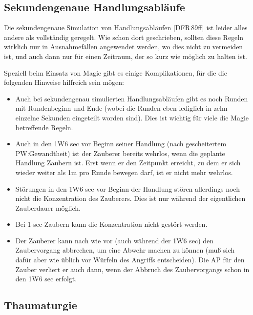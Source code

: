 \documentclass[10pt,a4paper,germanpar]{article}
\begin{document}


\subsection{Sekundengenaue Handlungsabläufe}

Die sekundengenaue Simulation von Handlungsabläufen [DFR\,89ff] ist
leider alles andere als vollständig geregelt. Wie schon dort
geschrieben, sollten diese Regeln wirklich nur in Ausnahmefällen
angewendet werden, wo dies nicht zu vermeiden ist, und auch dann nur
für einen Zeitraum, der so kurz wie möglich zu halten ist.

Speziell beim Einsatz von Magie gibt es einige Komplikationen, für die
die folgenden Hinweise hilfreich sein mögen:

\begin{itemize}
\item Auch bei sekundengenau simulierten Handlungsabläufen gibt es
  noch Runden mit Rundenbeginn und Ende (wobei die Runden eben
  lediglich in zehn einzelne Sekunden eingeteilt worden sind). Dies
  ist wichtig für viele die Magie betreffende Regeln.
\item Auch in den 1W6 sec vor Beginn seiner Handlung (nach gescheitertem
  PW:Gewandtheit) ist der Zauberer bereits wehrlos, wenn die geplante Handlung
  Zaubern ist. Erst wenn er den Zeitpunkt erreicht, zu dem er sich
  wieder weiter als 1m pro Runde bewegen darf, ist er nicht mehr wehrlos.
\item Störungen in den 1W6 sec vor Beginn der Handlung stören
  allerdings noch nicht die Konzentration des Zauberers. Dies ist nur
  während der eigentlichen Zauberdauer möglich.
\item Bei 1-sec-Zaubern kann die Konzentration nicht gestört werden.
\item Der Zauberer kann nach wie vor (auch während der 1W6 sec) den
  Zaubervorgang abbrechen, um eine Abwehr machen zu können (muß sich dafür
  aber wie üblich vor Würfeln des Angriffs entscheiden). Die AP für den Zauber
  verliert er auch dann, wenn der Abbruch des Zaubervorgangs schon in den 1W6
  sec erfolgt. 
\end{itemize}

\subsection{Thaumaturgie}
\end{document}
